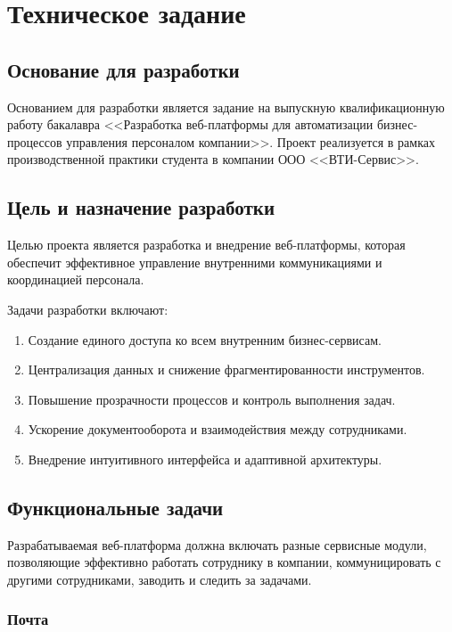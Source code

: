 \section{Техническое задание}

\subsection{Основание для разработки}

Основанием для разработки является задание на выпускную квалификационную работу бакалавра <<Разработка веб-платформы для автоматизации бизнес-процессов управления персоналом компании>>. Проект реализуется в рамках производственной практики студента в компании ООО <<ВТИ-Сервис>>.

\subsection{Цель и назначение разработки}

Целью проекта является разработка и внедрение веб-платформы, которая обеспечит эффективное управление внутренними коммуникациями и координацией персонала.

Задачи разработки включают:

\begin{enumerate}
  \item Создание единого доступа ко всем внутренним бизнес-сервисам.
  \item Централизация данных и снижение фрагментированности инструментов.
  \item Повышение прозрачности процессов и контроль выполнения задач.
  \item Ускорение документооборота и взаимодействия между сотрудниками.
  \item Внедрение интуитивного интерфейса и адаптивной архитектуры.
\end{enumerate}

\subsection{Функциональные задачи}

Разрабатываемая веб-платформа должна включать разные сервисные модули, позволяющие эффективно работать сотруднику в компании, коммуницировать с другими сотрудниками, заводить и следить за задачами.

\subsubsection{Почта}

